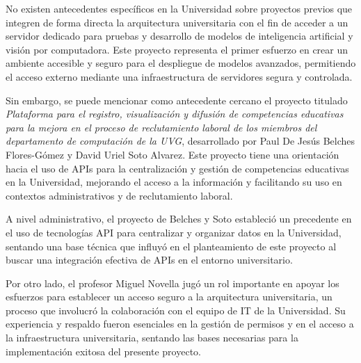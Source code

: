 No existen antecedentes específicos en la Universidad sobre proyectos previos que integren de forma directa la arquitectura universitaria con el fin de acceder a un servidor dedicado para pruebas y desarrollo de modelos de inteligencia artificial y visión por computadora. Este proyecto representa el primer esfuerzo en crear un ambiente accesible y seguro para el despliegue de modelos avanzados, permitiendo el acceso externo mediante una infraestructura de servidores segura y controlada.

Sin embargo, se puede mencionar como antecedente cercano el proyecto titulado \textit{Plataforma para el registro, visualización y difusión de competencias educativas para la mejora en el proceso de reclutamiento laboral de los miembros del departamento de computación de la UVG}, desarrollado por Paul De Jesús Belches Flores-Gómez y David Uriel Soto Alvarez. Este proyecto tiene una orientación hacia el uso de APIs para la centralización y gestión de competencias educativas en la Universidad, mejorando el acceso a la información y facilitando su uso en contextos administrativos y de reclutamiento laboral.

A nivel administrativo, el proyecto de Belches y Soto estableció un precedente en el uso de tecnologías API para centralizar y organizar datos en la Universidad, sentando una base técnica que influyó en el planteamiento de este proyecto al buscar una integración efectiva de APIs en el entorno universitario.

Por otro lado, el profesor Miguel Novella jugó un rol importante en apoyar los esfuerzos para establecer un acceso seguro a la arquitectura universitaria, un proceso que involucró la colaboración con el equipo de IT de la Universidad. Su experiencia y respaldo fueron esenciales en la gestión de permisos y en el acceso a la infraestructura universitaria, sentando las bases necesarias para la implementación exitosa del presente proyecto.
